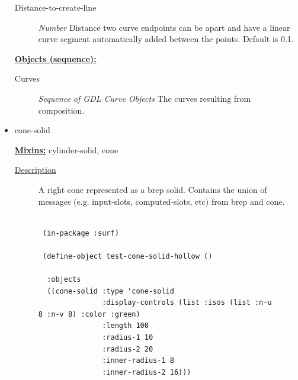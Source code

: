 \documentclass [11pt]{book}
\begin{document}
\begin{itemize}
\begin{description}
\item [Distance-to-create-line]
\emph{Number} Distance two curve endpoints can be apart and have a linear curve segment automatically added between the points. Default is 0.1.


\end{description}






\textbf{
\underline{Objects (sequence):}}

\begin{description}

\item [Curves]
\emph{Sequence of GDL Curve Objects} The curves resulting from composition.


\end{description}







\item {}cone-solid


\textbf{
\underline{Mixins:}} cylinder-solid, cone





\begin{description}

\item [
\underline{Description}]


A right cone represented as a brep solid. Contains the union of messages (e.g. input-slots, computed-slots, etc)
from brep and cone.



\end{description}




\begin{figure}
\begin{lrbox}{\boxedverb}
\begin{minipage}{\linewidth}
{\small

\begin{verbatim}
                  
 (in-package :surf)

 (define-object test-cone-solid-hollow ()
  
  :objects
  ((cone-solid :type 'cone-solid
               :display-controls (list :isos (list :n-u 8 :n-v 8) :color :green)
               :length 100 
               :radius-1 10 
               :radius-2 20
               :inner-radius-1 8 
               :inner-radius-2 16)))
 

\end{verbatim}}
\end{minipage}
\end{lrbox}
\end{figure}
\end{itemize}
\end{document}
